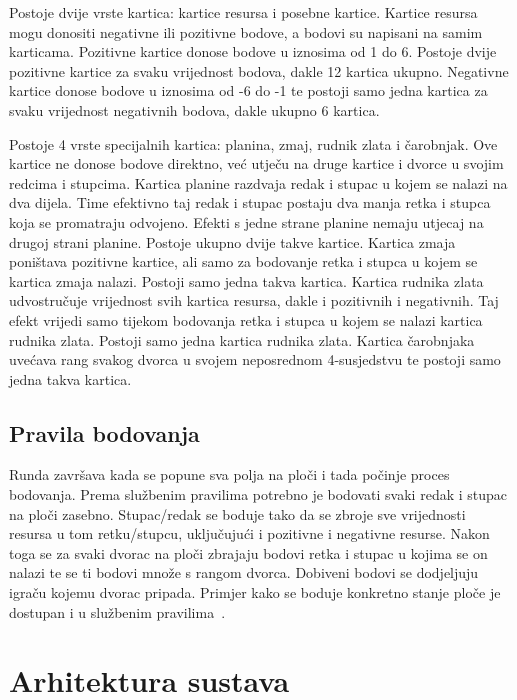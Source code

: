 \documentclass[diplomskirad]{fer}
\begin{document}
	Postoje dvije vrste kartica: kartice resursa i posebne kartice. Kartice resursa mogu donositi negativne ili pozitivne bodove, a bodovi su napisani na samim karticama. Pozitivne kartice donose bodove u iznosima od 1 do 6. Postoje dvije pozitivne kartice za svaku vrijednost bodova, dakle 12 kartica ukupno. Negativne kartice donose bodove u iznosima od -6 do -1 te postoji samo jedna kartica za svaku vrijednost negativnih bodova, dakle ukupno 6 kartica.
	
	Postoje 4 vrste specijalnih kartica: planina, zmaj, rudnik zlata i čarobnjak. Ove kartice ne donose bodove direktno, već utječu na druge kartice i dvorce u svojim redcima i stupcima. Kartica planine razdvaja redak i stupac u kojem se nalazi na dva dijela. Time efektivno taj redak i stupac postaju dva manja retka i stupca koja se promatraju odvojeno. Efekti s jedne strane planine nemaju utjecaj na drugoj strani planine. Postoje ukupno dvije takve kartice. Kartica zmaja poništava pozitivne kartice, ali samo za bodovanje retka i stupca u kojem se kartica zmaja nalazi. Postoji samo jedna takva kartica. Kartica rudnika zlata udvostručuje vrijednost svih kartica resursa, dakle i pozitivnih i negativnih. Taj efekt vrijedi samo tijekom bodovanja retka i stupca u kojem se nalazi kartica rudnika zlata. Postoji samo jedna kartica rudnika zlata. Kartica čarobnjaka uvećava rang svakog dvorca u svojem neposrednom 4-susjedstvu te postoji samo jedna takva kartica.
	
	\section{Pravila bodovanja}
		Runda završava kada se popune sva polja na ploči i tada počinje proces bodovanja. Prema službenim pravilima potrebno je bodovati svaki redak i stupac na ploči zasebno. Stupac/redak se boduje tako da se zbroje sve vrijednosti resursa u tom retku/stupcu, uključujući i pozitivne i negativne resurse. Nakon toga se za svaki dvorac na ploči zbrajaju bodovi retka i stupac u kojima se on nalazi te se ti bodovi množe s rangom dvorca. Dobiveni bodovi se dodjeljuju igraču kojemu dvorac pripada. Primjer kako se boduje konkretno stanje ploče je dostupan i u službenim pravilima~\cite{KingdomsRulebook}.
	

\chapter{Arhitektura sustava}
\label{pog:arhitektura}
\end{document}
